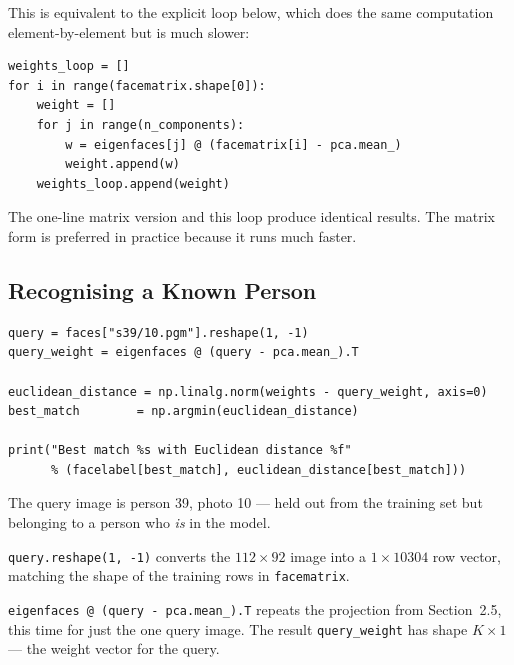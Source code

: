 \documentclass[12pt,a4paper]{article}
\begin{document}
This is equivalent to the explicit loop below, which does the same
computation element-by-element but is much slower:

\vspace{0.5em}
\begin{minipage}{\linewidth}
\begin{lstlisting}[caption={Equivalent loop form (slower, for illustration only)}]
weights_loop = []
for i in range(facematrix.shape[0]):
    weight = []
    for j in range(n_components):
        w = eigenfaces[j] @ (facematrix[i] - pca.mean_)
        weight.append(w)
    weights_loop.append(weight)
\end{lstlisting}
\end{minipage}

The one-line matrix version and this loop produce identical results. The
matrix form is preferred in practice because it runs much faster.

\subsection{Recognising a Known Person}

\vspace{0.5em}
\begin{minipage}{\linewidth}
\begin{lstlisting}[caption={Query with a held-out image from a known class}]
query = faces["s39/10.pgm"].reshape(1, -1)
query_weight = eigenfaces @ (query - pca.mean_).T

euclidean_distance = np.linalg.norm(weights - query_weight, axis=0)
best_match        = np.argmin(euclidean_distance)

print("Best match %s with Euclidean distance %f"
      % (facelabel[best_match], euclidean_distance[best_match]))
\end{lstlisting}
\end{minipage}

The query image is person 39, photo 10 --- held out from the training set
but belonging to a person who \emph{is} in the model.

\texttt{query.reshape(1, -1)} converts the $112 \times 92$ image into a
$1 \times 10304$ row vector, matching the shape of the training rows in
\texttt{facematrix}.

\texttt{eigenfaces @ (query - pca.mean\_).T} repeats the projection from
Section~2.5, this time for just the one query image. The result
\texttt{query\_weight} has shape $K \times 1$ --- the weight vector for
the query.
\end{document}
